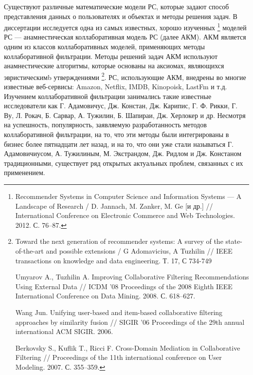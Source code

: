 Существуют различные математические модели РС,
которые задают способ
представления данных о пользователях и объектах и
методы решения задач.
В диссертации исследуется одна из самых известных,
хорошо изученных
	\footnote{Recommender Systems in Computer Science and Information Systems
	--- A Landscape of Research / D. Jannach, M. Zanker, M. Ge [и др.]
	// International Conference on Electronic Commerce and Web Technologies.
	2012. С. 76–87.}
моделей РС --- анамнестическая коллаборативная модель
РС (далее АКМ). АКМ является одним из классов
коллаборативных моделей, применяющих методы коллаборативной фильтрации.
Методы решений задач АКМ используют анамнестические алгоритмы, которые
основаны на аксиомах, являющихся эвристическимb утверждениями
	\footnote{
		Toward the next generation of recommender systems: A survey of the
		state-of-the-art and possible extensions / G Adomavicius, A Tuzhilin //
		IEEE transactions on knowledge and data engineering. Т. 17, С 734-749

		Umyarov A., Tuzhilin A. Improving Collaborative Filtering Recommendations
		Using External Data // ICDM ’08 Proceedings of the 2008 Eighth IEEE
		International Conference on Data Mining. 2008. С. 618–627.

		Wang Jun. Unifying user-based and item-based collaborative filtering approaches
		by similarity fusion // SIGIR ’06 Proceedings of the 29th annual international
		ACM SIGIR. 2006.

		Berkovsky S., Kuflik T., Ricci F. Cross-Domain Mediation in Collaborative
		Filtering // Proceedings of the 11th international conference on User Modeling.
		2007. С. 355–359.
	}.
РС, использующие АКМ, внедрены во многие известные веб-сервисы:
Amazon, Netflix, IMDB, Kinopoisk, LastFm и т.д.
Изучением коллаборативной фильтрации занимались такие известные исследователи как
Г. Адамовичус, Дж. Констан, Дж. Карипис, Г. Ф. Рикки, Г. Ву, Л. Рокач, Б. Сарвар, А. Тужилин, Б. Шапираи, Дж. Херлокер и др.
Несмотря на успешность, популярность, заявляемую разработанность методов
коллаборативной фильтрации, на то,
что эти методы были интегрированы в бизнес более пятнадцати лет назад,
и на то, что они
уже стали называться Г. Адамовичиусом, А. Тужилиным, М. Экстрандом,
Дж. Ридлом и Дж. Констаном традиционными,
существует ряд открытых актуальных проблем, связанных с их применением.


